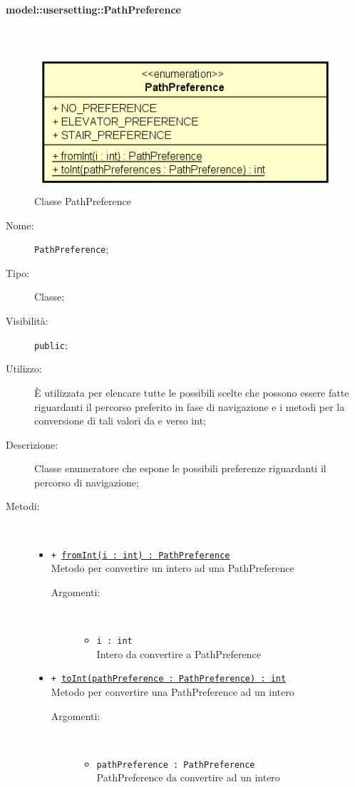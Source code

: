 \documentclass[../DefinizioneDiProdotto.tex]{subfiles}
\begin{document}
\paragraph{model::usersetting::PathPreference}
\
\begin{figure}[H]
	\centering
	\includegraphics[width=\maxwidth]{img/PathPreference.png}
	\caption{Classe PathPreference}\label{fig:model::usersetting::PathPreference} 
\end{figure}
\begin{description}
	\item[Nome:] \texttt{PathPreference};
	\item[Tipo:] Classe;
	\item[Visibilità:] \texttt{public};
	\item[Utilizzo:] È utilizzata per elencare tutte le possibili scelte che possono essere fatte riguardanti il percorso preferito in fase di navigazione e i metodi per la conversione di tali valori da e verso int;
	\item[Descrizione:] Classe enumeratore che espone le possibili preferenze riguardanti il percorso di navigazione;
	\item[Metodi:] \
	\begin{itemize}
		\item \texttt{+ \underline{fromInt(i : int) : PathPreference}}\\
		Metodo per convertire un intero ad una PathPreference
		\begin{description}
			\item[Argomenti:] \
			\begin{itemize}
				\item \texttt{i : int}\\
				Intero da convertire a PathPreference\end{itemize}
		\end{description}
		\item \texttt{+ \underline{toInt(pathPreference : PathPreference) : int}}\\
		Metodo per convertire una PathPreference ad un intero
		\begin{description}
			\item[Argomenti:] \
			\begin{itemize}
				\item \texttt{pathPreference : PathPreference}\\
				PathPreference da convertire ad un intero\end{itemize}
		\end{description}
	\end{itemize}
\end{description}
\end{document}
